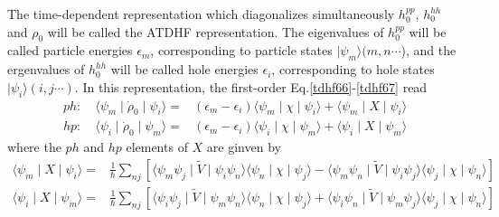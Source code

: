   The time-dependent representation which diagonalizes simultaneously $h_0^{pp}$, $h_0^{hh}$ and $\rho_0$ will be called the ATDHF representation. The eigenvalues of $h_0^{pp}$ will be called particle energies $\epsilon_m$, corresponding to particle states $\mid \psi_m \rangle(m, n\cdots$), and the ergenvalues of $h_0^{hh}$ will be called hole energies $\epsilon_i$, corresponding to hole states $\mid \psi_i \rangle(i, j \cdots)$. In this representation, the first-order Eq.\eqref{tdhf66}-\eqref{tdhf67} read
  \begin{equation}
    \begin{aligned}
      ph:\quad \langle \psi_m \mid \dot{\rho}_0 \mid \psi_i \rangle =& (\epsilon_m - \epsilon_i)\langle \psi_m \mid\chi\mid \psi_i \rangle + \langle \psi_m \mid X \mid \psi_i \rangle\\ \label{tdhf71}
      hp:\quad \langle \psi_i \mid \dot{\rho}_0 \mid \psi_m \rangle =& (\epsilon_m - \epsilon_i)\langle \psi_i \mid\chi\mid \psi_m \rangle + \langle \psi_i \mid X \mid \psi_m \rangle
    \end{aligned}
  \end{equation}
  where the $ph$ and $hp$ elements of $X$  are ginven by 
  \begin{equation}
    \begin{aligned}
      \langle \psi_m \mid X \mid \psi_i \rangle =& \frac{1}{\hbar} \sum_{nj}\left[\langle \psi_m \psi_j\mid \tilde{V} \mid \psi_i \psi_n \rangle \langle \psi_n \mid \chi \mid \psi_j \rangle - \langle \psi_m \psi_n \mid \tilde{V} \mid \psi_i \psi_j \rangle \langle \psi_j \mid \chi \mid \psi_n \rangle \right] \\ \label{tdhf72}
      \langle \psi_i \mid X \mid \psi_m \rangle =& \frac{1}{\hbar} \sum_{nj}\left[\langle \psi_i \psi_j\mid \tilde{V} \mid \psi_m \psi_n \rangle \langle \psi_n \mid \chi \mid \psi_j \rangle + \langle \psi_i \psi_n \mid \tilde{V} \mid \psi_m \psi_j \rangle \langle \psi_j \mid \chi \mid \psi_n \rangle \right] 
    \end{aligned}
  \end{equation}
  
